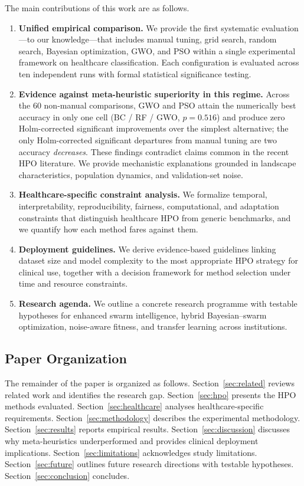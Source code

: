 \documentclass[letterpaper, 10 pt, conference]{ieeeconf}
\begin{document}
The main contributions of this work are as follows.
\begin{enumerate}
	\item \textbf{Unified empirical comparison.} We provide the first systematic evaluation---to our knowledge---that includes manual tuning, grid search, random search, Bayesian optimization, GWO, and PSO within a single experimental framework on healthcare classification. Each configuration is evaluated across ten independent runs with formal statistical significance testing.
	\item \textbf{Evidence against meta-heuristic superiority in this regime.} Across the $60$ non-manual comparisons, GWO and PSO attain the numerically best accuracy in only one cell (BC / RF / GWO, $p = 0.516$) and produce zero Holm-corrected significant improvements over the simplest alternative; the only Holm-corrected significant departures from manual tuning are two accuracy \emph{decreases}. These findings contradict claims common in the recent HPO literature. We provide mechanistic explanations grounded in landscape characteristics, population dynamics, and validation-set noise.
	\item \textbf{Healthcare-specific constraint analysis.} We formalize temporal, interpretability, reproducibility, fairness, computational, and adaptation constraints that distinguish healthcare HPO from generic benchmarks, and we quantify how each method fares against them.
	\item \textbf{Deployment guidelines.} We derive evidence-based guidelines linking dataset size and model complexity to the most appropriate HPO strategy for clinical use, together with a decision framework for method selection under time and resource constraints.
	\item \textbf{Research agenda.} We outline a concrete research programme with testable hypotheses for enhanced swarm intelligence, hybrid Bayesian--swarm optimization, noise-aware fitness, and transfer learning across institutions.
\end{enumerate}

\subsection{Paper Organization}

The remainder of the paper is organized as follows. Section~\ref{sec:related} reviews related work and identifies the research gap. Section~\ref{sec:hpo} presents the HPO methods evaluated. Section~\ref{sec:healthcare} analyses healthcare-specific requirements. Section~\ref{sec:methodology} describes the experimental methodology. Section~\ref{sec:results} reports empirical results. Section~\ref{sec:discussion} discusses why meta-heuristics underperformed and provides clinical deployment implications. Section~\ref{sec:limitations} acknowledges study limitations. Section~\ref{sec:future} outlines future research directions with testable hypotheses. Section~\ref{sec:conclusion} concludes.
\end{document}
